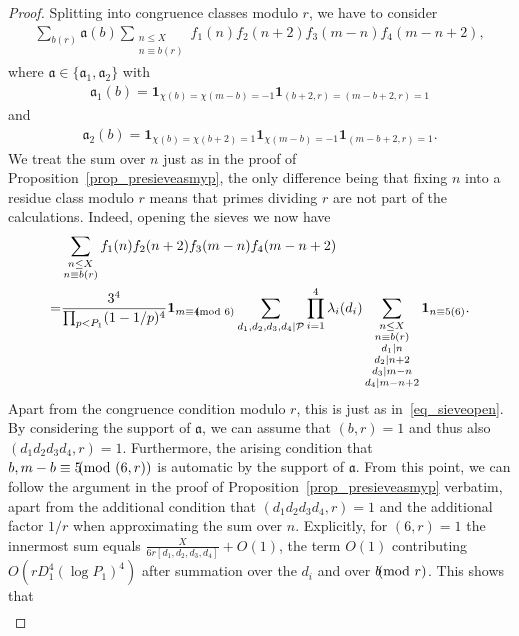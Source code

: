 \documentclass[12pt]{amsart}
\theoremstyle{definition}
\theoremstyle{remark}
\numberwithin{equation}{section}
\newcommand{\1}{\mathbf{1}}
\let\oldpmod\pmod
\renewcommand{\pmod}[1]{\hspace{-0.12cm}\oldpmod {#1}}
\begin{document}
\begin{proof}
	Splitting into congruence classes modulo $r$, we have to consider
	\begin{align*}
	   \sum_{b(r)}\mathfrak{a}(b)\sum_{\substack{n\leq X \\ n\equiv b(r)}} f_1(n)f_2(n+2)f_3(m-n)f_4(m-n+2),
	\end{align*}
	where $\mathfrak{a}\in\{\mathfrak{a}_1,\mathfrak{a}_2\}$ with
	\begin{align*}
		\mathfrak{a}_1(b)=\1_{\chi(b)=\chi(m-b)=-1}\1_{(b+2,r)=(m-b+2,r)=1}
	\end{align*}
	and
	\begin{align*}
	   \mathfrak{a}_2(b)=\1_{\chi(b)=\chi(b+2)=1}\1_{\chi(m-b)=-1} \1_{(m-b+2,r)=1}.
	\end{align*}
     We treat the sum over $n$ just as in the proof of Proposition~\ref{prop_presieveasmyp}, the only difference being that fixing $n$ into a residue class modulo $r$ means that primes dividing $r$ are not part of the calculations. Indeed, opening the sieves we now have
	\begin{align*}
		&\sum_{\substack{n\leq X \\ n\equiv b(r)}} f_1(n)f_2(n+2)f_3(m-n)f_4(m-n+2)
		\\=&  \frac{3^4}{\prod_{p<P_1}(1-1/p)^4} \1_{m\equiv 4\pmod 6}  \sum_{d_1,d_2,d_3,d_4\mid \mathcal{P}}  \prod_{i=1}^4\lambda_{i}(d_i) \sum_{\substack{n\leq X\\ n\equiv b(r)\\ d_1\mid n \\ d_2\mid n+2 \\ d_3\mid m-n \\ d_4\mid  m-n+2}}  \1_{n\equiv 5(6)}.
 	\end{align*}
    Apart from the congruence condition modulo $r$, this is just as in~\eqref{eq_sieveopen}. By considering the support of $\mathfrak{a}$, we can assume that $(b,r)=1$ and thus also $(d_1d_2d_3d_4,r)=1$. Furthermore, the arising condition that $b,m-b\equiv 5 \pmod{(6,r)}$ is automatic by the support of $\mathfrak{a}$. From this point, we can follow the argument in the proof of Proposition~\ref{prop_presieveasmyp} verbatim, apart from the additional condition that $(d_1d_2d_3d_4,r)=1$ and the additional factor $1/r$ when approximating the sum over $n$. Explicitly, for $(6,r)=1$ the innermost sum equals $\tfrac{X}{6r[d_1,d_2,d_3,d_4]}+O(1)$, the term $O(1)$ contributing $O(rD_1^4(\log P_1)^4)$ after summation over the $d_i$ and over $b\pmod r$. This shows that
	\begin{align*}   

\end{align*}
\end{proof}
\end{document}
